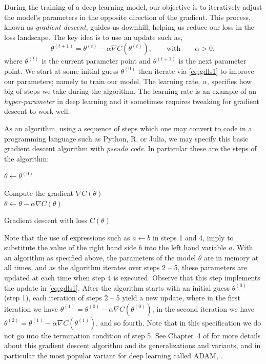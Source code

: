 \documentclass[12pt]{article}
\begin{document}
During the training of a deep learning model, our objective is to iteratively adjust the model's parameters in the opposite direction of the gradient. This process, known as {\em gradient descent}, guides us downhill, helping us reduce our loss in the loss landscape. The key idea is to use an update such as,
%
\begin{equation}
\label{eq:gdls1}
\theta^{(t+1)} = \theta^{(t)} - \alpha \nabla C(\theta^{(t)}),
\qquad
\text{with}
\qquad
\alpha > 0,
\end{equation}
%
where $\theta^{(t)}$ is the current parameter point and $\theta^{(t+1)}$ is the next parameter point. We start at some initial guess  $\theta^{(0)}$ then iterate via \eqref{eq:gdls1} to improve our parameters; namely to train our model. The learning rate, $\alpha$,  specifies how big of steps we take during the algorithm. The learning rate is an example of an {\em hyper-parameter} in deep learning and it sometimes requires tweaking for gradient descent to work well.

As an algorithm, using a sequence of steps which one may convert to code in a programming language such as Python, R, or Julia, we may specify this basic gradient descent algorithm with {\em pseudo code}. In particular these are the  steps of the algorithm:

\vspace{0.5cm}
\begin{algorithm}[H]
\renewcommand{\thealgocf}{} %
\DontPrintSemicolon
  $\theta \leftarrow \theta^{(0)}$
  
   { 
  Compute the gradient $ \nabla C(\theta)$\\
   $\theta \leftarrow \theta - \alpha \nabla C(\theta)$
  }
\caption{Gradient descent with loss $C(\theta)$}\label{alg:basic-gradient-descent}
\end{algorithm}
\vspace{0.5cm}

%
Note that the use of expressions such as $a \leftarrow b$ in steps 1 and 4, imply to substitute the value of the right hand side $b$ into the left hand variable $a$. With an algorithm as specified above, the parameters of the model $\theta$ are in memory at all times, and as the algorithm iterates over steps 2 -- 5, these parameters are updated at each time when step 4 is executed. Observe that this step implements the update in \eqref{eq:gdls1}. After the algorithm starts with an initial guess $\theta^{(0)}$ (step 1), each iteration of steps 2 -- 5 yield a new update, where in the first iteration we have $\theta^{(1)} = \theta^{(0)} - \alpha \nabla C(\theta^{(0)})$, in the second iteration we have $\theta^{(2)} = \theta^{(1)} - \alpha \nabla C(\theta^{(1)})$, and so fourth. Note that in this specification we do not go into the termination condition of step 5. See Chapter~4 of  \cite{LiquetMokaNazarathy2024DeepLearning} for more details about this gradient descent algorithm and its generalizations and variants, and in particular the most popular variant for deep learning called ADAM, \cite{kingma2014adam}. 
\end{document}
